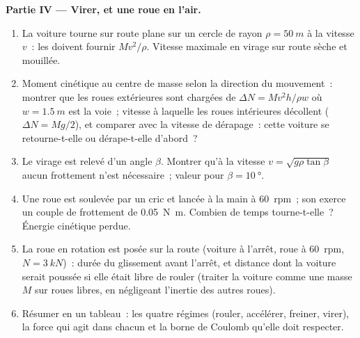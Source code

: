 \begin{problem}
\medskip
\noindent\textbf{Partie IV --- Virer, et une roue en l'air.}
\begin{enumerate}[resume]
  \item La voiture tourne sur route plane sur un cercle de rayon
        $\rho = \qty{50}{m}$ à la vitesse $v$~: les  doivent fournir
        $Mv^2/\rho$. Vitesse maximale en virage sur route sèche et mouillée.
  \item Moment cinétique au centre de masse selon la direction du
        mouvement~: montrer que les roues extérieures sont chargées de $\Delta N =
        Mv^2h/\rho w$ où $w = \qty{1.5}{m}$ est la voie~; vitesse à
        laquelle les roues intérieures décollent ($\Delta N = Mg/2$), et comparer
        avec la vitesse de dérapage~: cette voiture se retourne-t-elle ou dérape-t-elle d'abord~?
  \item Le virage est relevé d'un angle $\beta$. Montrer qu'à la vitesse
        $v = \sqrt{g\rho\tan\beta}$ aucun frottement n'est nécessaire~; valeur
        pour $\beta = \qty{10}{\degree}$.
  \item Une roue est soulevée par un cric et lancée à la main à
        \qty{60}{rpm}~; son  exerce un couple de frottement de
        \qty{0.05}{N.m}. Combien de temps tourne-t-elle~? Énergie cinétique perdue.
  \item La roue en rotation est posée sur la route (voiture à l'arrêt, roue
        à \qty{60}{rpm}, $N = \qty{3}{kN}$)~: durée du glissement avant l'arrêt,
        et distance dont la voiture serait poussée si elle était libre de
        rouler (traiter la voiture comme une masse $M$ sur roues libres, en négligeant
        l'inertie des autres roues).
  \item Résumer en un tableau~: les quatre régimes (rouler, accélérer,
        freiner, virer), la force qui agit dans chacun et la
        borne de Coulomb qu'elle doit respecter.
\end{enumerate}
\end{problem}
